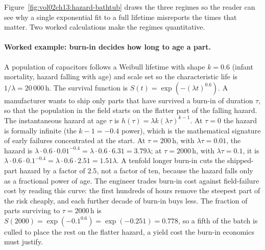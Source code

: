 

Figure~\ref{fig:vol02ch13:hazard-bathtub} draws the three regimes so the
reader can see why a single exponential fit to a full lifetime
misreports the times that matter. Two worked calculations make the
regimes quantitative.

\paragraph{Worked example: burn-in decides how long to age a part.} A
population of capacitors follows a Weibull lifetime with shape $k = 0.6$
(infant mortality, hazard falling with age) and scale set so the
characteristic life is $1/\lambda = 20\,000\,\text{h}$. The survival
function is $S(t) = \exp(-(\lambda t)^{0.6})$. A manufacturer wants to
ship only parts that have survived a burn-in of duration $\tau$, so that
the population in the field starts on the flatter part of the falling
hazard. The instantaneous hazard at age $\tau$ is $h(\tau) = \lambda k
(\lambda \tau)^{k - 1}$. At $\tau = 0$ the hazard is formally infinite
(the $k - 1 = -0.4$ power), which is the mathematical signature of early
failures concentrated at the start. At $\tau = 200\,\text{h}$, with
$\lambda \tau = 0.01$, the hazard is $\lambda \cdot 0.6 \cdot
0.01^{-0.4} = \lambda \cdot 0.6 \cdot 6.31 = 3.79\lambda$; at $\tau =
2000\,\text{h}$, with $\lambda\tau = 0.1$, it is $\lambda \cdot 0.6
\cdot 0.1^{-0.4} = \lambda \cdot 0.6 \cdot 2.51 = 1.51\lambda$. A tenfold
longer burn-in cuts the shipped-part hazard by a factor of $2.5$, not a
factor of ten, because the hazard falls only as a fractional power of
age. The engineer trades burn-in cost against field-failure cost by
reading this curve: the first hundreds of hours remove the steepest part
of the risk cheaply, and each further decade of burn-in buys less. The
fraction of parts surviving to $\tau = 2000\,\text{h}$ is $S(2000) =
\exp(-0.1^{0.6}) = \exp(-0.251) = 0.778$, so a fifth of the batch is
culled to place the rest on the flatter hazard, a yield cost the burn-in
economics must justify.

